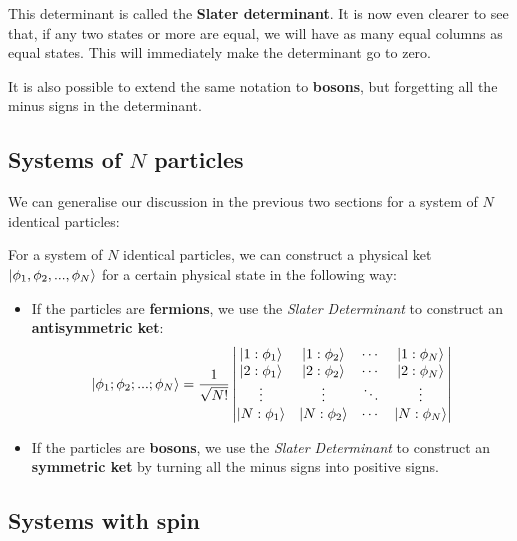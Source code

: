 This determinant is called the \textbf{Slater determinant}. It is now even clearer to see that, if any two states or more are equal, we will have as many equal columns as equal states. This will immediately make the determinant go to zero.

It is also possible to extend the same notation to \textbf{bosons}, but forgetting all the minus signs in the determinant.

\subsection{Systems of $N$ particles}

We can generalise our discussion in the previous two sections for a system of $N$ identical particles:

\begin{definition}
    For a system of $N$ identical particles, we can construct a physical ket $\ket{\phi_1,\phi_2,...,\phi_N}$ for a certain physical state in the following way:
    \begin{itemize}
        \item If the particles are \textbf{fermions}, we use the \textit{Slater Determinant} to construct an \textbf{antisymmetric ket}:
        \begin{equation}
            \ket{\phi_1;\phi_2;...;\phi_N} = \frac{1}{\sqrt{N!}}\left|\begin{matrix}
                \ket{1:\phi_1} & \ket{1:\phi_2} & \cdots & \ket{1:\phi_N}\\
                \ket{2:\phi_1} & \ket{2:\phi_2} & \cdots & \ket{2:\phi_N}\\
                \vdots & \vdots & \ddots & \vdots \\
                \ket{N:\phi_1} & \ket{N:\phi_2} & \cdots & \ket{N:\phi_N}\\
            \end{matrix}\right|
        \end{equation}
        \item If the particles are \textbf{bosons}, we use the \textit{Slater Determinant} to construct an \textbf{symmetric ket} by turning all the minus signs into positive signs.
    \end{itemize}
\end{definition}

\subsection{Systems with spin}

